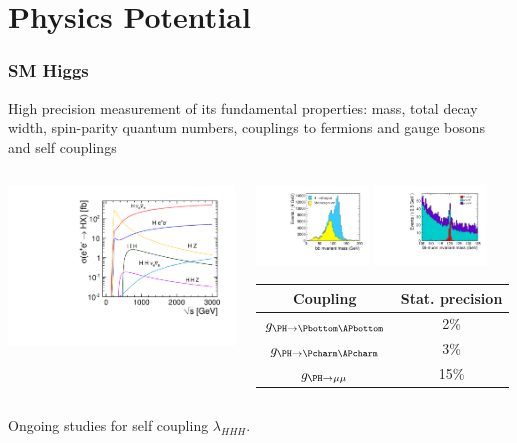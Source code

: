 \documentclass{beamer}
\begin{document}
\section{Physics Potential}
\begin{frame}
\frametitle{SM Higgs}
High precision measurement of its fundamental properties: mass,
total decay width, spin-parity quantum numbers, couplings to fermions and gauge bosons and
self couplings\\
\begin{columns}[c]
\column{6cm}
\includegraphics[width=6cm]{../SIDWorkshop/xsec_vs_cme.pdf}
\column{6cm}
\begin{center}
\includegraphics[width=3cm]{../SIDWorkshop/ee_h_bb_mass_mh120GeV.pdf}
\includegraphics[width=3cm]{../SIDWorkshop/ee_h_mumu_mass_mh120GeV.pdf}\\
\begin{tabular}{cc}
Coupling & Stat. precision\\
\midrule
$g_{\PH\to\Pbottom\APbottom}$ & 2\%\\
$g_{\PH\to\Pcharm\APcharm}$ & 3\% \\
$g_{\PH\to\mu\mu}$ & 15\%\\
\bottomrule
\end{tabular}
\end{center}
\end{columns}
Ongoing studies for self coupling $\lambda_{HHH}$.
\end{frame}
\end{document}
